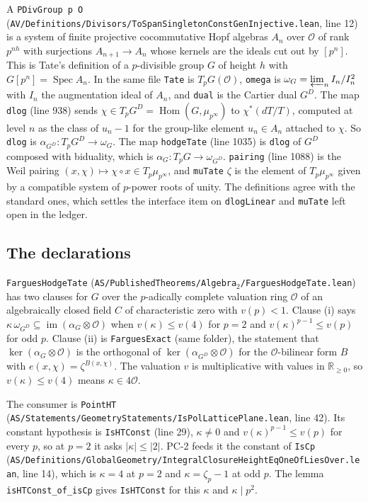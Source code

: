 \documentclass[11pt]{article}
\newcommand{\lean}[1]{\nolinkurl{#1}}
\theoremstyle{definition}
\theoremstyle{remark}
\newcommand{\cO}{\mathcal O}
\begin{document}
A \lean{PDivGroup p O} (\texttt{AV/Definitions/Divisors/ToSpanSingletonConstGenInjective.lean}, line 12) is a system of finite projective cocommutative Hopf algebras $A_n$ over $\cO$ of rank $p^{nh}$ with surjections $A_{n+1}\to A_n$ whose kernels are the ideals cut out by $[p^n]$. This is Tate's definition of a $p$-divisible group $G$ of height $h$ with $G[p^n]=\operatorname{Spec}A_n$. In the same file \lean{Tate} is $T_pG(\cO)$, \lean{omega} is $\omega_G=\varprojlim_n I_n/I_n^2$ with $I_n$ the augmentation ideal of $A_n$, and \lean{dual} is the Cartier dual $G^D$. The map \lean{dlog} (line 938) sends $\chi\in T_pG^D=\operatorname{Hom}(G,\mu_{p^\infty})$ to $\chi^*(dT/T)$, computed at level $n$ as the class of $u_n-1$ for the group-like element $u_n\in A_n$ attached to $\chi$. So \lean{dlog} is $\alpha_{G^D}\colon T_pG^D\to\omega_G$. The map \lean{hodgeTate} (line 1035) is \lean{dlog} of $G^D$ composed with biduality, which is $\alpha_G\colon T_pG\to\omega_{G^D}$. \lean{pairing} (line 1088) is the Weil pairing $(x,\chi)\mapsto\chi\circ x\in T_p\mu_{p^\infty}$, and \lean{muTate} $\zeta$ is the element of $T_p\mu_{p^\infty}$ given by a compatible system of $p$-power roots of unity. The definitions agree with the standard ones, which settles the interface item on \lean{dlogLinear} and \lean{muTate} left open in the ledger.

\subsection{The declarations}

\lean{FarguesHodgeTate} (\texttt{AS/PublishedTheorems/Algebra$_2$/FarguesHodgeTate.lean}) has two clauses for $G$ over the $p$-adically complete valuation ring $\cO$ of an algebraically closed field $C$ of characteristic zero with $v(p)<1$. Clause (i) says $\kappa\,\omega_{G^D}\subseteq\operatorname{im}(\alpha_G\otimes\cO)$ when $v(\kappa)\le v(4)$ for $p=2$ and $v(\kappa)^{p-1}\le v(p)$ for odd $p$. Clause (ii) is \lean{FarguesExact} (same folder), the statement that $\ker(\alpha_G\otimes\cO)$ is the orthogonal of $\ker(\alpha_{G^D}\otimes\cO)$ for the $\cO$-bilinear form $B$ with $e(x,\chi)=\zeta^{B(x,\chi)}$. The valuation $v$ is multiplicative with values in $\mathbb R_{\ge0}$, so $v(\kappa)\le v(4)$ means $\kappa\in4\cO$.

The consumer is \lean{PointHT} (\texttt{AS/Statements/GeometryStatements/IsPolLatticePlane.lean}, line 42). Its constant hypothesis is \lean{IsHTConst} (line 29), $\kappa\ne0$ and $v(\kappa)^{p-1}\le v(p)$ for every $p$, so at $p=2$ it asks $\lvert\kappa\rvert\le\lvert2\rvert$. PC-2 feeds it the constant of \lean{IsCp} (\texttt{AS/Definitions/GlobalGeometry/IntegralClosureHeightEqOneOfLiesOver.lean}, line 14), which is $\kappa=4$ at $p=2$ and $\kappa=\zeta_p-1$ at odd $p$. The lemma \lean{isHTConst_of_isCp} gives \lean{IsHTConst} for this $\kappa$ and $\kappa\mid p^2$.
\end{document}
